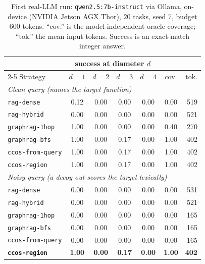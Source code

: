 \documentclass[11pt]{article}
\newcommand{\code}[1]{\texttt{#1}}
\begin{document}
\begin{table}[h]
\centering
\begin{tabular}{lcccccr}
\toprule
& \multicolumn{4}{c}{success at diameter $d$} & & \\
\cmidrule(lr){2-5}
Strategy & $d{=}1$ & $d{=}2$ & $d{=}3$ & $d{=}4$ & cov. & tok. \\
\midrule
\multicolumn{7}{l}{\emph{Clean query (names the target function)}}\\
\code{rag-dense}      & 0.12 & 0.00 & 0.00 & 0.00 & 0.00 & 519 \\
\code{rag-hybrid}     & 0.00 & 0.00 & 0.00 & 0.00 & 0.00 & 521 \\
\code{graphrag-1hop}  & 1.00 & 0.00 & 0.00 & 0.00 & 0.40 & 270 \\
\code{graphrag-bfs}   & 1.00 & 0.00 & 0.17 & 0.00 & 1.00 & 402 \\
\code{ccos-from-query}& 1.00 & 0.00 & 0.17 & 0.00 & 1.00 & 402 \\
\code{ccos-region}    & 1.00 & 0.00 & 0.17 & 0.00 & 1.00 & 402 \\
\midrule
\multicolumn{7}{l}{\emph{Noisy query (a decoy out-scores the target lexically)}}\\
\code{rag-dense}      & 0.00 & 0.00 & 0.00 & 0.00 & 0.00 & 531 \\
\code{rag-hybrid}     & 0.00 & 0.00 & 0.00 & 0.00 & 0.00 & 521 \\
\code{graphrag-1hop}  & 0.00 & 0.00 & 0.00 & 0.00 & 0.00 & 165 \\
\code{graphrag-bfs}   & 0.00 & 0.00 & 0.00 & 0.00 & 0.00 & 165 \\
\code{ccos-from-query}& 0.00 & 0.00 & 0.00 & 0.00 & 0.00 & 165 \\
\textbf{\code{ccos-region}} & \textbf{1.00} & \textbf{0.00} & \textbf{0.17} & \textbf{0.00} & \textbf{1.00} & \textbf{402} \\
\bottomrule
\end{tabular}
\caption{First real-LLM run: \code{qwen2.5:7b-instruct} via Ollama, on-device
(NVIDIA Jetson AGX Thor), $20$ tasks, seed $7$, budget $600$ tokens. ``cov.'' is
the model-independent oracle coverage; ``tok.'' the mean input tokens. Success is
an exact-match integer answer.}
\label{tab:real}
\end{table}
\end{document}
